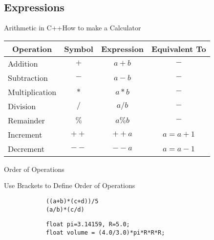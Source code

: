 \subsection{Expressions}

\begin{frame}[fragile]{Arithmetic in C++}{How to make a Calculator}
    \begin{center}
        \begin{table}[]
    \centering
    \begin{tabular}{lccc}
    \hline
    \multicolumn{1}{c}{\textbf{Operation}} & \textbf{Symbol} & \textbf{Expression} & \textbf{Equivalent To} \\ \hline
    Addition          & $+ $     & $a + b$    & $-$         \\ \hline
    Subtraction       & $- $     & $a - b$    & $-$         \\ \hline
    Multiplication    & $* $     & $a * b$    & $-$         \\ \hline
    Division          & $/ $     & $a / b$    & $-$         \\ \hline
    Remainder         & $\%$     & $a \% b$   & $-$         \\ \hline
    \pause
    Increment         & $++$     & $++a$      & $a = a+1$    \\ \hline
    Decrement         & $--$     & $--a$      & $a = a-1$    \\ \hline
    \end{tabular}
    \end{table}
    \end{center}
\end{frame}

\begin{frame}[fragile]{Order of Operations}{}
    \Large
    \begin{block}{Use Brackets to Define Order of Operations}
        \begin{verbatim}
            ((a+b)*(c+d))/5
            (a/b)*(c/d)
        \end{verbatim}
    \end{block}
    \begin{example}
        \begin{verbatim}
            float pi=3.14159, R=5.0;
            float volume = (4.0/3.0)*pi*R*R*R;
        \end{verbatim}
    \end{example}
\end{frame}

